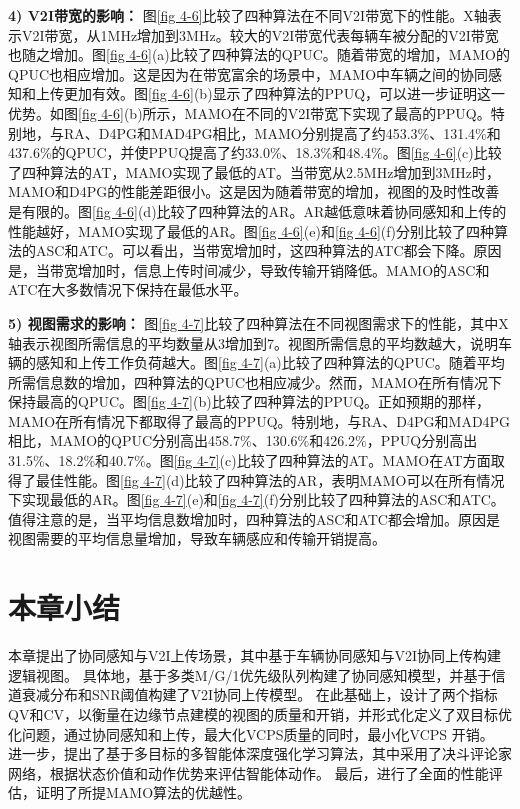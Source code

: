 \textbf{4) V2I带宽的影响：}
图\ref{fig 4-6}比较了四种算法在不同V2I带宽下的性能。X轴表示V2I带宽，从1MHz增加到3MHz。较大的V2I带宽代表每辆车被分配的V2I带宽也随之增加。图\ref{fig 4-6}(a)比较了四种算法的QPUC。随着带宽的增加，MAMO的QPUC也相应增加。这是因为在带宽富余的场景中，MAMO中车辆之间的协同感知和上传更加有效。图\ref{fig 4-6}(b)显示了四种算法的PPUQ，可以进一步证明这一优势。如图\ref{fig 4-6}(b)所示，MAMO在不同的V2I带宽下实现了最高的PPUQ。特别地，与RA、D4PG和MAD4PG相比，MAMO分别提高了约453.3\%、131.4\%和437.6\%的QPUC，并使PPUQ提高了约33.0\%、18.3\%和48.4\%。图\ref{fig 4-6}(c)比较了四种算法的AT，MAMO实现了最低的AT。当带宽从2.5MHz增加到3MHz时，MAMO和D4PG的性能差距很小。这是因为随着带宽的增加，视图的及时性改善是有限的。图\ref{fig 4-6}(d)比较了四种算法的AR。AR越低意味着协同感知和上传的性能越好，MAMO实现了最低的AR。图\ref{fig 4-6}(e)和\ref{fig 4-6}(f)分别比较了四种算法的ASC和ATC。可以看出，当带宽增加时，这四种算法的ATC都会下降。原因是，当带宽增加时，信息上传时间减少，导致传输开销降低。MAMO的ASC和ATC在大多数情况下保持在最低水平。

\textbf{5) 视图需求的影响：}
图\ref{fig 4-7}比较了四种算法在不同视图需求下的性能，其中X轴表示视图所需信息的平均数量从3增加到7。视图所需信息的平均数越大，说明车辆的感知和上传工作负荷越大。图\ref{fig 4-7}(a)比较了四种算法的QPUC。随着平均所需信息数的增加，四种算法的QPUC也相应减少。然而，MAMO在所有情况下保持最高的QPUC。图\ref{fig 4-7}(b)比较了四种算法的PPUQ。正如预期的那样，MAMO在所有情况下都取得了最高的PPUQ。特别地，与RA、D4PG和MAD4PG相比，MAMO的QPUC分别高出458.7\%、130.6\%和426.2\%，PPUQ分别高出31.5\%、18.2\%和40.7\%。图\ref{fig 4-7}(c)比较了四种算法的AT。MAMO在AT方面取得了最佳性能。图\ref{fig 4-7}(d)比较了四种算法的AR，表明MAMO可以在所有情况下实现最低的AR。图\ref{fig 4-7}(e)和\ref{fig 4-7}(f)分别比较了四种算法的ASC和ATC。值得注意的是，当平均信息数增加时，四种算法的ASC和ATC都会增加。原因是视图需要的平均信息量增加，导致车辆感应和传输开销提高。

\section[\hspace{-2pt}本章小结]{{ \hspace{-8pt}本章小结}}\label{section 4-7}

本章提出了协同感知与V2I上传场景，其中基于车辆协同感知与V2I协同上传构建逻辑视图。
具体地，基于多类M/G/1优先级队列构建了协同感知模型，并基于信道衰减分布和SNR阈值构建了V2I协同上传模型。
在此基础上，设计了两个指标QV和CV，以衡量在边缘节点建模的视图的质量和开销，并形式化定义了双目标优化问题，通过协同感知和上传，最大化VCPS质量的同时，最小化VCPS 开销。
进一步，提出了基于多目标的多智能体深度强化学习算法，其中采用了决斗评论家网络，根据状态价值和动作优势来评估智能体动作。
最后，进行了全面的性能评估，证明了所提MAMO算法的优越性。